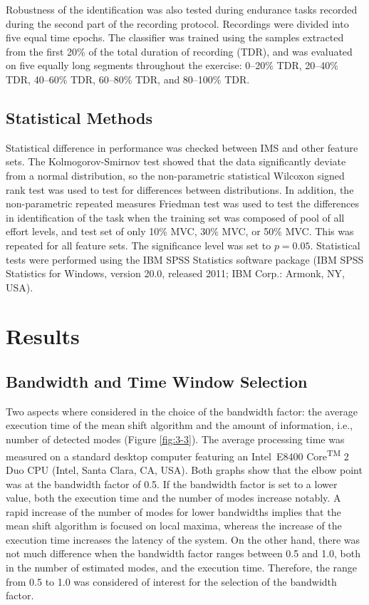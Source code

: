 Robustness of the identification was also tested during endurance tasks recorded during the second part of the recording protocol. Recordings were divided into five equal time epochs. The classifier was trained using the samples extracted from the first 20\% of the total duration of recording (TDR), and was evaluated on five equally long segments throughout the exercise: 0–20\% TDR, 20–40\% TDR, 40–60\% TDR, 60–80\% TDR, and 80–100\% TDR.


\subsection{Statistical Methods}
Statistical difference in performance was checked between IMS and other feature sets. The Kolmogorov-Smirnov test showed that the data significantly deviate from a normal distribution, so the non-parametric statistical Wilcoxon signed rank test was used to test for differences between distributions. In addition, the non-parametric repeated measures Friedman test was used to test the differences in identification of the task when the training set was composed of pool of all effort levels, and test set of only 10\% MVC, 30\% MVC, or 50\% MVC. This was repeated for all feature sets. The significance level was set to $p = 0.05$. Statistical tests were performed using the IBM SPSS Statistics software package (IBM SPSS Statistics for Windows, version 20.0, released 2011; IBM Corp.: Armonk, NY, USA).
\clearpage


\section{Results}
\subsection{Bandwidth and Time Window Selection}
Two aspects where considered in the choice of the bandwidth factor: the average execution time of the mean shift algorithm and the amount of information, i.e., number of detected modes (Figure \ref{fig:3-3}). The average processing time was measured on a standard desktop computer featuring an Intel\textregistered \, E8400 Core\textsuperscript{TM} 2 Duo CPU (Intel, Santa Clara, CA, USA). Both graphs show that the elbow point was at the bandwidth factor of 0.5. If the bandwidth factor is set to a lower value, both the execution time and the number of modes increase notably. A rapid increase of the number of modes for lower bandwidths implies that the mean shift algorithm is focused on local maxima, whereas the increase of the execution time increases the latency of the system. On the other hand, there was not much difference when the bandwidth factor ranges between 0.5 and 1.0, both in the number of estimated modes, and the execution time. Therefore, the range from 0.5 to 1.0 was considered of interest for the selection of the bandwidth factor.

